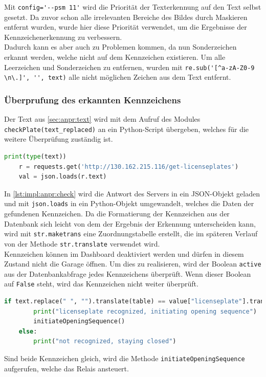 Mit \verb|config='--psm 11'| wird die Priorität der Texterkennung auf den Text selbst gesetzt. Da zuvor schon alle irrelevanten Bereiche des Bildes durch Maskieren entfernt wurden, wurde hier diese Priorität verwendet, um die Ergebnisse der Kennzeichenerkennung zu verbessern. \cite{PSM11} \\
Dadurch kann es aber auch zu Problemen kommen, da nun Sonderzeichen erkannt werden, welche nicht auf dem Kennzeichen existieren. Um alle Leerzeichen und Sonderzeichen zu entfernen, wurden mit \verb|re.sub('[^a-zA-Z0-9 \n\.]', '', text)| alle nicht möglichen Zeichen aus dem Text entfernt.


\subsubsection{Überprufung des erkannten Kennzeichens}
Der Text aus \ref{sec:anpr:text} wird mit dem Aufruf des Modules \verb|checkPlate(text_replaced)| an ein Python-Script übergeben, welches für die weitere Überprüfung zuständig ist.

\begin{lstlisting}[language=Python, caption=Abfrage der Kennzeichen aus der Datenbank, label=lst:impl:anpr:check:db]
    print(type(text))
    r = requests.get('http://130.162.215.116/get-licenseplates')
    val = json.loads(r.text)
\end{lstlisting}

In \ref{lst:impl:anpr:check} wird die Antwort des Servers in ein JSON-Objekt geladen und mit \verb|json.loads| in ein Python-Objekt umgewandelt, welches die Daten der gefundenen Kennzeichen. Da die Formatierung der Kennzeichen aus der Datenbank sich leicht von dem der Ergebnis der Erkennung unterscheiden kann, wird mit \verb|str.maketrans| eine Zuordnungstabelle erstellt, die im späteren Verlauf von der Methode \verb|str.translate| verwendet wird.\\
Kennzeichen können im Dashboard deaktiviert werden und dürfen in diesem Zustand nicht die Garage öffnen. Um dies zu realisieren, wird der Boolean \verb|active| aus der Datenbankabfrage jedes Kennzeichens überprüft. Wenn dieser Boolean auf \verb|False| steht, wird das Kennzeichen nicht weiter überprüft.\\

 \begin{lstlisting}[language=Python, caption=Überprüfung auf Gleichheit der beiden Strings, label=lst:impl:anpr:check]
    if text.replace(" ", "").translate(table) == value["licenseplate"].translate(table).replace(" ", ""):
        print("licenseplate recognized, initiating opening sequence")
        initiateOpeningSequence()
    else:
        print("not recognized, staying closed")
 \end{lstlisting}
 Sind beide Kennzeichen gleich, wird die Methode \verb|initiateOpeningSequence| aufgerufen, welche das Relais ansteuert.
